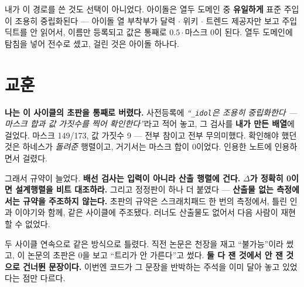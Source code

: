 \documentclass[10pt]{article}
\begin{document}
내가 이 경로를 쓴 것도 선택이 아니었다. 아이돌은 열두 도메인 중
\textbf{유일하게} 표준 주입이 조용히 중립화된다 --- 아이돌 열
부착부가 달력 $\cdot$ 위키 $\cdot$ 트렌드 제공자만 보고 주입 딕트를
안 읽어서, 이름만 등록되고 값은 통째로 $0.5\cdot$마스크 $0$이 된다.
열두 도메인에 탐침을 넣어 전수로 셌고, 걸린 것은 아이돌 하나다.

\section{교훈}

\textbf{나는 이 사이클의 초판을 통째로 버렸다.} 사전등록에
\emph{``\texttt{\_idol}은 조용히 중립화한다 --- 마스크 합과 값
가짓수를 찍어 확인한다''}라고 적어 놓고, 그 검사를 \textbf{내가 만든
배열}에 걸었다. 마스크 149/173, 값 가짓수 9 --- 전부 참이고 전부
무의미했다. 확인해야 했던 것은 하네스가 \emph{돌려준} 행렬이고,
거기서는 마스크 합이 0이었다. 인용한 노트에 인용하면서 걸렸다.

그래서 규약이 늘었다. \textbf{배선 검사는 입력이 아니라 산출 행렬에
건다.} \textbf{$\Delta$가 정확히 0이면 설계행렬을 비트 대조하라.}
그리고 정정판이 하나 더 붙였다 --- \textbf{산출물 없는 측정에서는
규약을 주조하지 않는다.} 초판의 규약은 스크래치패드 한 번의 측정에서,
틀린 인과 이야기와 함께, 같은 사이클에 주조됐다. 러너도 산출물도
없어서 다음 사람이 재현할 수 없었다.

두 사이클 연속으로 같은 방식으로 틀렸다. 직전 논문은 천장을 재고
``불가능''이라 썼고, 이 논문의 초판은 0을 보고 ``트리가 안 가른다''고
썼다. \textbf{둘 다 잰 것에서 안 잰 것으로 건너뛴 문장이다.} 이번엔
코드가 그 문장을 반박하는 주석을 이미 달아 놓고 있었다는 점만 다르다.
\end{document}
